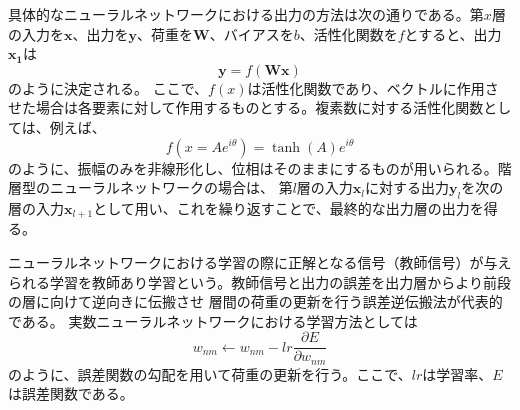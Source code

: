\documentclass[11pt,a4paper,uplatex,draft]{ujarticle}
\begin{document}
    具体的なニューラルネットワークにおける出力の方法は次の通りである。第$x$層の入力を$\bm{x}$、出力を$\bm{y}$、荷重を$\bm{W}$、バイアスを$b$、活性化関数を$f$とすると、出力$\bm{x_1}$は
    \begin{equation}
      \bm{y} = f(\bm{W}\bm{x})
    \end{equation}
    のように決定される。
    ここで、$f(x)$は活性化関数であり、ベクトルに作用させた場合は各要素に対して作用するものとする。複素数に対する活性化関数としては、例えば、
    \begin{equation}\label{activation_function}
      f(x = Ae^{i\theta}) = \tanh(A)e^{i\theta}
    \end{equation}
    のように、振幅のみを非線形化し、位相はそのままにするものが用いられる。階層型のニューラルネットワークの場合は、
    第$l$層の入力$\bm{x}_l$に対する出力$\bm{y}_l$を次の層の入力$\bm{x}_{l+1}$として用い、これを繰り返すことで、最終的な出力層の出力を得る。

    ニューラルネットワークにおける学習の際に正解となる信号（教師信号）が与えられる学習を教師あり学習という。教師信号と出力の誤差を出力層からより前段の層に向けて逆向きに伝搬させ
    層間の荷重の更新を行う誤差逆伝搬法が代表的である。
    実数ニューラルネットワークにおける学習方法としては
    \begin{equation}
      w_{nm} \leftarrow w_{nm} - lr \frac{\partial E}{\partial w_{nm}}
    \end{equation}
    のように、誤差関数の勾配を用いて荷重の更新を行う。ここで、$lr$は学習率、$E$は誤差関数である。
\end{document}
